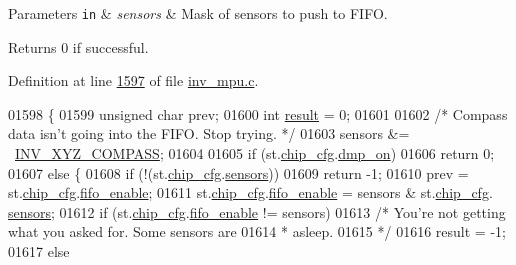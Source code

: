 \begin{DoxyParams}[1]{Parameters}
\mbox{\tt in}  & {\em sensors} & Mask of sensors to push to F\+I\+FO. \\
\hline
\end{DoxyParams}
\begin{DoxyReturn}{Returns}
0 if successful. 
\end{DoxyReturn}


Definition at line \hyperlink{inv__mpu_8c_source_l01597}{1597} of file \hyperlink{inv__mpu_8c_source}{inv\+\_\+mpu.\+c}.


\begin{DoxyCode}
01598 \{
01599     \textcolor{keywordtype}{unsigned} \textcolor{keywordtype}{char} prev;
01600     \textcolor{keywordtype}{int} \hyperlink{sensor_8h_a4c9d9cb8bb9d2b707a152051408f40e5}{result} = 0;
01601 
01602     \textcolor{comment}{/* Compass data isn't going into the FIFO. Stop trying. */}
01603     sensors &= ~\hyperlink{group___d_r_i_v_e_r_s_ga7fc9c1dbdcb2ac8cc2a4128a5799482a}{INV\_XYZ\_COMPASS};
01604 
01605     \textcolor{keywordflow}{if} (st.\hyperlink{structgyro__state__s_ac895217592e2084bd520b0be8e9d20ee}{chip\_cfg}.\hyperlink{structchip__cfg__s_a49fb51079238683b21264827348b5968}{dmp\_on})
01606         \textcolor{keywordflow}{return} 0;
01607     \textcolor{keywordflow}{else} \{
01608         \textcolor{keywordflow}{if} (!(st.\hyperlink{structgyro__state__s_ac895217592e2084bd520b0be8e9d20ee}{chip\_cfg}.\hyperlink{structchip__cfg__s_aaa21c01566947e7007476657cb614e3f}{sensors}))
01609             \textcolor{keywordflow}{return} -1;
01610         prev = st.\hyperlink{structgyro__state__s_ac895217592e2084bd520b0be8e9d20ee}{chip\_cfg}.\hyperlink{structchip__cfg__s_a1f258910658cfcf4bed56c0de8637441}{fifo\_enable};
01611         st.\hyperlink{structgyro__state__s_ac895217592e2084bd520b0be8e9d20ee}{chip\_cfg}.\hyperlink{structchip__cfg__s_a1f258910658cfcf4bed56c0de8637441}{fifo\_enable} = sensors & st.\hyperlink{structgyro__state__s_ac895217592e2084bd520b0be8e9d20ee}{chip\_cfg}.
      \hyperlink{structchip__cfg__s_aaa21c01566947e7007476657cb614e3f}{sensors};
01612         \textcolor{keywordflow}{if} (st.\hyperlink{structgyro__state__s_ac895217592e2084bd520b0be8e9d20ee}{chip\_cfg}.\hyperlink{structchip__cfg__s_a1f258910658cfcf4bed56c0de8637441}{fifo\_enable} != sensors)
01613             \textcolor{comment}{/* You're not getting what you asked for. Some sensors are}
01614 \textcolor{comment}{             * asleep.}
01615 \textcolor{comment}{             */}
01616             result = -1;
01617         \textcolor{keywordflow}{else}

\end{DoxyCode}
